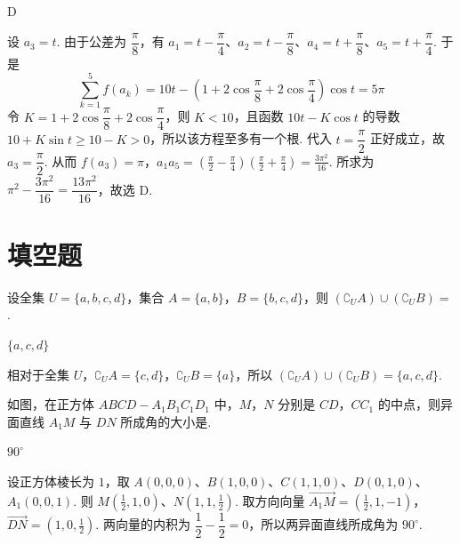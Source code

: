 \begin{answer}
D
\end{answer}

\begin{solution}
设 \(a_3=t\). 由于公差为 \(\dfrac\pi8\)，有
\(a_1=t-\dfrac\pi4\)、\(a_2=t-\dfrac\pi8\)、\(a_4=t+\dfrac\pi8\)、\(a_5=t+\dfrac\pi4\). 于是
\[
\sum_{k=1}^{5}f(a_k)=10t-\left(1+2\cos\frac\pi8+2\cos\frac\pi4\right)\cos t=5\pi
\]
令 \(K=1+2\cos\dfrac\pi8+2\cos\dfrac\pi4\)，则 \(K<10\)，且函数 \(10t-K\cos t\) 的导数
\(10+K\sin t\geqslant10-K>0\)，所以该方程至多有一个根. 代入 \(t=\dfrac\pi2\) 正好成立，故 \(a_3=\dfrac\pi2\). 从而
\(f(a_3)=\pi\)，\(a_1a_5=\left(\frac\pi2-\frac\pi4\right)\left(\frac\pi2+\frac\pi4\right)=\frac{3\pi^2}{16}\).
所求为 \(\pi^2-\dfrac{3\pi^2}{16}=\dfrac{13\pi^2}{16}\)，故选 D.
\end{solution}

\section{填空题}

\begin{problem}
设全集 \(U = \{a, b, c, d\}\)，集合 \(A = \{a, b\}\)，\(B = \{b, c, d\}\)，则 \(\left(\complement_U A\right) \cup \left(\complement_U B\right) = \)\fillinblank{}.
\end{problem}

\begin{answer}
\(\{a,c,d\}\)
\end{answer}

\begin{solution}
相对于全集 \(U\)，\(\complement_U A=\{c,d\}\)，\(\complement_U B=\{a\}\)，所以
\(\left(\complement_U A\right)\cup\left(\complement_U B\right)=\{a,c,d\}\).
\end{solution}

\begin{problem}
如图，在正方体 \(ABCD - A_{1}B_{1}C_{1}D_{1}\) 中，\(M\)，\(N\) 分别是 \(CD\)，\(CC_{1}\) 的中点，则异面直线 \(A_{1}M\) 与 \(DN\) 所成角的大小是\fillinblank{}.

\end{problem}

\begin{answer}
\(90^{\circ}\)
\end{answer}

\begin{solution}
设正方体棱长为 \(1\)，取
\(A(0,0,0)\)、\(B(1,0,0)\)、\(C(1,1,0)\)、\(D(0,1,0)\)、\(A_1(0,0,1)\). 则
\(M(\frac12,1,0)\)、\(N(1,1,\frac12)\). 取方向向量
\(\overrightarrow{A_1M}=\left(\frac12,1,-1\right)\)，\(\overrightarrow{DN}=\left(1,0,\frac12\right)\).
两向量的内积为 \(\dfrac12-\dfrac12=0\)，所以两异面直线所成角为 \(90^{\circ}\).
\end{solution}

